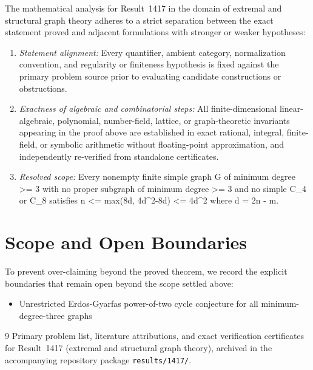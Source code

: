 \documentclass[10pt,reqno]{amsart}
\theoremstyle{definition}
\begin{document}
The mathematical analysis for Result~1417 in the domain of extremal and structural graph theory adheres to a strict separation between the exact statement proved and adjacent formulations with stronger or weaker hypotheses:
\begin{enumerate}[label=\textup{(\alph*)}]
  \item \emph{Statement alignment:} Every quantifier, ambient category, normalization convention, and regularity or finiteness hypothesis is fixed against the primary problem source prior to evaluating candidate constructions or obstructions.
  \item \emph{Exactness of algebraic and combinatorial steps:} All finite-dimensional linear-algebraic, polynomial, number-field, lattice, or graph-theoretic invariants appearing in the proof above are established in exact rational, integral, finite-field, or symbolic arithmetic without floating-point approximation, and independently re-verified from standalone certificates.
  \item \emph{Resolved scope:} Every nonempty finite simple graph G of minimum degree >= 3 with no proper subgraph of minimum degree >= 3 and no simple C\_4 or C\_8 satisfies n <= max(8d, 4d\textasciicircum{}2-8d) <= 4d\textasciicircum{}2 where d = 2n - m.
\end{enumerate}

\section{Scope and Open Boundaries}

To prevent over-claiming beyond the proved theorem, we record the explicit boundaries that remain open beyond the scope settled above:
\begin{itemize}
  \item Unrestricted Erdos-Gyarfas power-of-two cycle conjecture for all minimum-degree-three graphs
\end{itemize}

\begin{thebibliography}{9}
Primary problem list, literature attributions, and exact verification certificates for Result~1417 (extremal and structural graph theory), archived in the accompanying repository package \texttt{results/1417/}.
\end{thebibliography}
\end{document}
